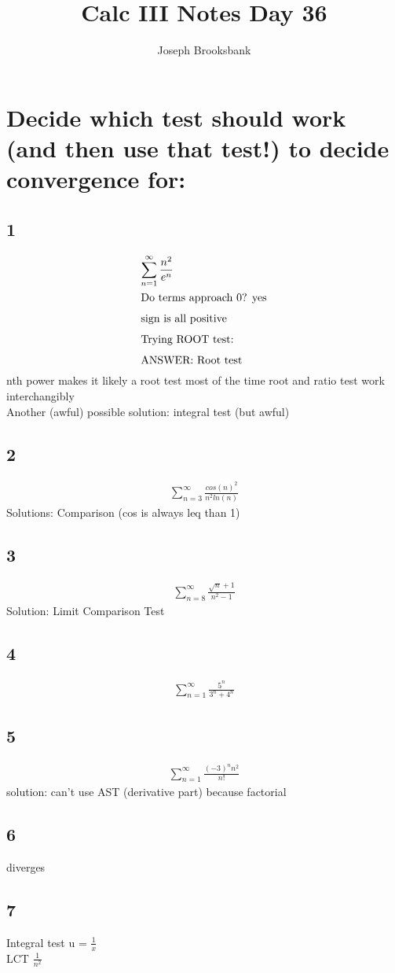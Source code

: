 \documentclass[12pt]{article}
\title{Calc III Notes Day 36}
\author{Joseph Brooksbank}
\begin{document}
\maketitle

\section*{Decide which test should work (and then use that test!) to decide convergence for:}

\subsection*{1}
\begin{align*}
        \sum_{n=1}^{\infty} \frac{n^{2}}{e^{n}} 
        \\
        \shortintertext{Do terms approach 0? yes}
        \shortintertext{sign is all positive} 
        \shortintertext{Trying ROOT test:} 
        \shortintertext{ANSWER: Root test} 
\end{align*}
nth power makes it likely a root test 
most of the time root and ratio test work interchangibly 
\\
Another (awful) possible solution: integral test (but awful) 

\subsection*{2}
\begin{align*}
        \sum_{n=3}^{\infty} \frac{cos(n)^{2}}{n^{2}ln(n)}
\end{align*}
Solutions: Comparison (cos is always leq than 1) 
\subsection*{3}
\begin{align*}
\sum_{n=8}^{\infty} \frac{\sqrt{n} +1}{n^{2}-1}
\end{align*}
Solution: Limit Comparison Test 

\subsection*{4}
\begin{align*}
        \sum_{n=1}^{\infty} \frac{5^{n}}{3^{n}+4^{n}} 
\end{align*}

\subsection*{5}
\begin{align*}
        \sum_{n=1}^{\infty} \frac{(-3)^{n}n^{2}}{n!} 
\end{align*}
solution: can't use AST (derivative part) because factorial 
\subsection*{6}
diverges
\subsection*{7}
Integral test u = $\frac{1}{x}$
\\
LCT $\frac{1}{n^{2}}$
\end{document}
